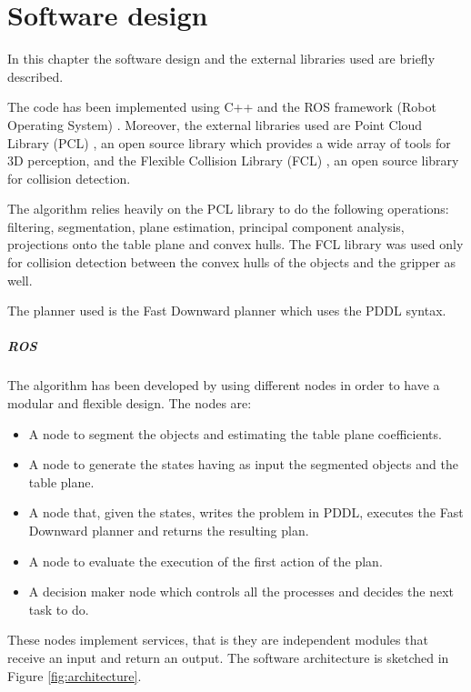 \chapter{Software design}
\label{ch:software_design}
In this chapter the software design and the  external libraries used are briefly described. 

The code has been implemented using C++ and the ROS framework (Robot Operating System) \citep{ROS}. 
Moreover, the external libraries used are Point Cloud Library (PCL) \citep{PCL}, an open source library which provides a wide array of tools for 3D perception, and the Flexible Collision Library (FCL) \citep{pan2012fcl}, an open source  library for collision detection.

The algorithm relies heavily on the PCL library to do the following operations: filtering, segmentation, plane estimation, principal component analysis, projections onto the table plane and convex hulls.
The FCL library was used only for collision detection between the convex hulls of the objects and the gripper as well. 

The planner used is the Fast Downward planner \citep{helmert2006fast} which uses the PDDL syntax.

\paragraph{ROS}
The algorithm has been developed by using different nodes in order to have a modular and flexible design. 
The nodes are:
\begin{itemize}
\item A node to segment the objects and estimating the table plane coefficients.
\item A node to generate the states having as input the segmented objects and the table plane.
\item A node that, given the states, writes the problem in PDDL, executes the Fast Downward planner and returns the resulting plan.
\item A node to evaluate the execution of the first action of the plan.
\item A decision maker node which controls all the processes and decides the next task to do.  
\end{itemize}

These nodes implement services, that is they are independent modules that receive an input and return an output.
The software architecture is sketched in Figure \ref{fig:architecture}. 

